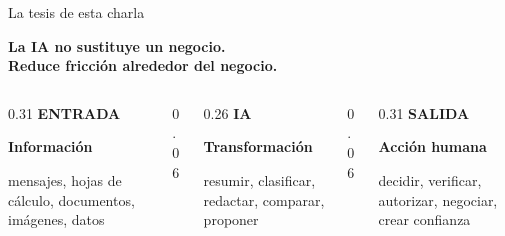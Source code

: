 \documentclass[aspectratio=169,11pt]{beamer}
\newcommand{\kicker}[1]{{\color{gold}\scriptsize\bfseries\MakeUppercase{#1}}}
\newcommand{\muted}[1]{{\color{muted}#1}}
\begin{document}
\begin{frame}{La tesis de esta charla}
\vspace{0.20cm}
\begin{center}
{\fontsize{25}{30}\selectfont\bfseries
La IA no sustituye un negocio.\\[0.12cm]
\color{forest}Reduce fricción alrededor del negocio.}
\end{center}

\vspace{0.65cm}
\begin{columns}[T,onlytextwidth]
\begin{column}{0.31\textwidth}
\kicker{Entrada}\par\vspace{0.18cm}
\textbf{Información}\par
\small\muted{mensajes, hojas de cálculo, documentos, imágenes, datos}
\end{column}
\begin{column}{0.06\textwidth}
\centering\vspace{0.45cm}{\Large\color{gold}$\longrightarrow$}
\end{column}
\begin{column}{0.26\textwidth}
\kicker{IA}\par\vspace{0.18cm}
\textbf{Transformación}\par
\small\muted{resumir, clasificar, redactar, comparar, proponer}
\end{column}
\begin{column}{0.06\textwidth}
\centering\vspace{0.45cm}{\Large\color{gold}$\longrightarrow$}
\end{column}
\begin{column}{0.31\textwidth}
\kicker{Salida}\par\vspace{0.18cm}
\textbf{Acción humana}\par
\small\muted{decidir, verificar, autorizar, negociar, crear confianza}
\end{column}
\end{columns}
\end{frame}
\end{document}
